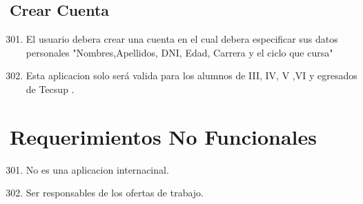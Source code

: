 \subsection{Crear Cuenta}
\begin{flushright}
	\begin{enumerate}
		\setcounter{enumi}{300}
		\item El usuario debera crear una cuenta en el cual debera especificar sus datos personales "Nombres,Apellidos, DNI, Edad, Carrera y el ciclo que cursa"
		\item Esta aplicacion solo será valida para los alumnos de III, IV, V ,VI y egresados de Tecsup .
	\end{enumerate}
\end{flushright}  

\section{Requerimientos No Funcionales}
\begin{flushright}
	\begin{enumerate}
		\setcounter{enumi}{300}
		\item No es una aplicacion internacinal.
		\item Ser responsables de los ofertas de trabajo.
	\end{enumerate}
\end{flushright}  



